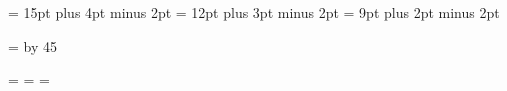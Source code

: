 \begin{\parsearg\beginxxx}
{\chapheadingskip = 15pt plus 4pt minus 2pt
\secheadingskip = 12pt plus 3pt minus 2pt
\subsecheadingskip = 9pt plus 2pt minus 2pt



%
\ifx\emergencystretch\thisisundefined
  \def\emergencystretch{}%
\else
  \emergencystretch = \hsize
  \divide\emergencystretch by 45
\fi

\def\smallbook{
  \global\chapheadingskip = 15pt plus 4pt minus 2pt
  \global\secheadingskip = 12pt plus 3pt minus 2pt
  \global\subsecheadingskip = 9pt plus 2pt minus 2pt
  \global\lispnarrowing = 0.3in
  \setleading{12pt}
  \advance\topskip by -1cm
  \global\parskip 2pt plus 1pt
  \global\hsize = 5in
  \global\vsize=7.5in
  \global\tolerance=700
  \global\hfuzz=1pt
  \global\contentsrightmargin=0pt
  \global\deftypemargin=0pt
  \global\defbodyindent=.5cm
  \global\pagewidth=\hsize
  \global\pageheight=\vsize
  \global\let\smalllisp=\smalllispx
  \global\let\smallexample=\smalllispx
  \global\def\Esmallexample{\Esmalllisp}
}

\def\afourpaper{
\global\tolerance=700
\global\hfuzz=1pt
\setleading{12pt}
\global\parskip 15pt plus 1pt

\global\vsize= 53\baselineskip
\advance\vsize by \topskip
\global\hsize=  6.5in
\global\outerhsize=\hsize
\global\advance\outerhsize by 0.5in
\global\outervsize=\vsize
\global\advance\outervsize by 0.6in

\global\pagewidth=\hsize
\global\pageheight=\vsize
}

\bindingoffset=0pt
\normaloffset=\hoffset
\pagewidth=\hsize
\pageheight=\vsize


}
\end{\parsearg\beginxxx}
